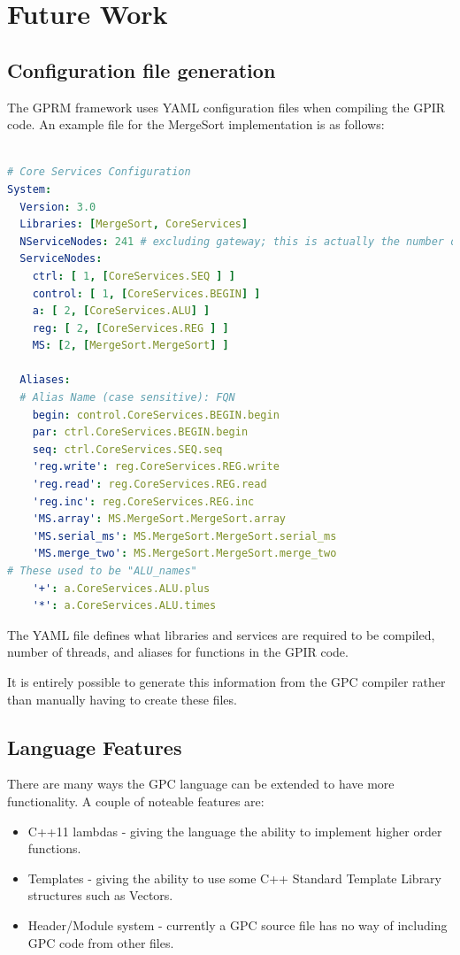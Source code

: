\chapter{Future Work}
\label{ch:future}

\section{Configuration file generation}

The GPRM framework uses YAML configuration files when compiling the GPIR code.
An example file for the MergeSort implementation is as follows:

\begin{lstlisting}[language=yaml]

# Core Services Configuration
System:
  Version: 3.0
  Libraries: [MergeSort, CoreServices]
  NServiceNodes: 241 # excluding gateway; this is actually the number of threads
  ServiceNodes:
    ctrl: [ 1, [CoreServices.SEQ ] ]
    control: [ 1, [CoreServices.BEGIN] ]
    a: [ 2, [CoreServices.ALU] ]
    reg: [ 2, [CoreServices.REG ] ]
    MS: [2, [MergeSort.MergeSort] ]

  Aliases:
  # Alias Name (case sensitive): FQN
    begin: control.CoreServices.BEGIN.begin
    par: ctrl.CoreServices.BEGIN.begin
    seq: ctrl.CoreServices.SEQ.seq
    'reg.write': reg.CoreServices.REG.write
    'reg.read': reg.CoreServices.REG.read
    'reg.inc': reg.CoreServices.REG.inc
    'MS.array': MS.MergeSort.MergeSort.array
    'MS.serial_ms': MS.MergeSort.MergeSort.serial_ms
    'MS.merge_two': MS.MergeSort.MergeSort.merge_two
# These used to be "ALU_names"  
    '+': a.CoreServices.ALU.plus
    '*': a.CoreServices.ALU.times
\end{lstlisting}

The YAML file defines what libraries and services are required to be compiled,
number of threads, and aliases for functions in the GPIR code.

It is entirely possible to generate this information from the GPC compiler rather
than manually having to create these files.


\section{Language Features}
    There are many ways the GPC language can be extended to have more
    functionality. A couple of noteable features are:
    \begin{itemize}
        \item C++11 lambdas - giving the language the ability to implement higher order functions.
        \item Templates - giving the ability to use some C++ Standard Template Library structures such as Vectors.
        \item Header/Module system - currently a GPC source file has no way of including GPC code
    from other files.

    \end{itemize} 

